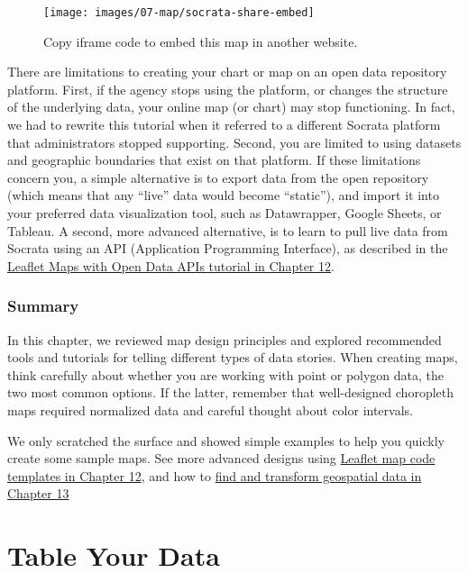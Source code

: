 \documentclass[
  english,
]{book}
\begin{document}
\begin{figure}
\texttt{[image: images/07-map/socrata-share-embed]} \caption{Copy iframe code to embed this map in another website.}\label{fig:socrata-share-embed}
\end{figure}

There are limitations to creating your chart or map on an open data repository platform. First, if the agency stops using the platform, or changes the structure of the underlying data, your online map (or chart) may stop functioning. In fact, we had to rewrite this tutorial when it referred to a different Socrata platform that administrators stopped supporting. Second, you are limited to using datasets and geographic boundaries that exist on that platform. If these limitations concern you, a simple alternative is to export data from the open repository (which means that any ``live'' data would become ``static''), and import it into your preferred data visualization tool, such as Datawrapper, Google Sheets, or Tableau. A second, more advanced alternative, is to learn to pull live data from Socrata using an API (Application Programming Interface), as described in the \href{leaflet-maps-open-data-apis.html}{Leaflet Maps with Open Data APIs tutorial in Chapter 12}.

\hypertarget{summary7}{%
\subsection*{Summary}\label{summary7}}

In this chapter, we reviewed map design principles and explored recommended tools and tutorials for telling different types of data stories. When creating maps, think carefully about whether you are working with point or polygon data, the two most common options. If the latter, remember that well-designed choropleth maps required normalized data and careful thought about color intervals.

We only scratched the surface and showed simple examples to help you quickly create some sample maps. See more advanced designs using \href{leaflet.html}{Leaflet map code templates in Chapter 12}, and how to \href{transform.html}{find and transform geospatial data in Chapter 13}

\hypertarget{table}{%
\chapter{Table Your Data}\label{table}}
\end{document}

